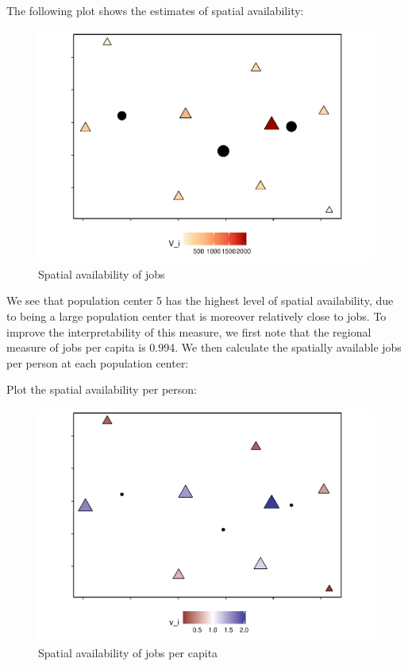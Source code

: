 \documentclass[]{elsarticle} %
\begin{document}
The following plot shows the estimates of spatial availability:

\begin{figure}
\includegraphics[width=1\linewidth]{Spatial-Availability_files/figure-latex/toy-example-availability-jobs-1} \caption{\label{fig:toy-example-availability-jobs}Spatial availability of jobs}\label{fig:toy-example-availability-jobs}
\end{figure}

We see that population center 5 has the highest level of spatial
availability, due to being a large population center that is moreover
relatively close to jobs. To improve the interpretability of this
measure, we first note that the regional measure of jobs per capita is
0.994. We then calculate the spatially available jobs per person at each
population center:

Plot the spatial availability per person:

\begin{figure}
\includegraphics[width=1\linewidth]{Spatial-Availability_files/figure-latex/toy-example-availability-jobs-per-capita-1} \caption{\label{fig:toy-example-availability-jobs-per-capita}Spatial availability of jobs per capita}\label{fig:toy-example-availability-jobs-per-capita}
\end{figure}
\end{document}
